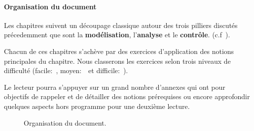 \paragraph{Organisation du document}
Les chapitres suivent un découpage classique autour des trois pilliers 
discutés précedemment que sont la \textbf{modélisation}, l'\textbf{analyse} 
et le \textbf{contrôle}. (c.f~).

Chacun de ces chapitres s'achève par des exercices d'application des 
notions principales du chapitre. Nous classerons les exercices selon 
trois niveaux de difficulté (facile:~\facile, moyen:~\moyen~et 
difficile:~\difficile).

Le lecteur pourra s'appuyer sur un grand nombre d'annexes qui ont pour 
objectifs de rappeler et de détailler des notions prérequises ou encore 
approfondir quelques aspects hors programme pour une deuxième lecture.
\begin{figure}[!h]
    \renewcommand\thefigure{A}
    \centering
        {
            \tikzset{external/export=false}
            
        }
    \caption{Organisation du document.\label{fig-diagramme_cours}}
\end{figure}
